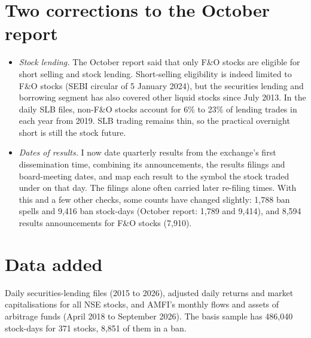\documentclass[11pt,a4paper]{article}
\begin{document}
\section{Two corrections to the October report}
\begin{itemize}
\item \emph{Stock lending.} The October report said that only F\&O stocks are eligible for short selling and stock lending.
Short-selling eligibility is indeed limited to F\&O stocks (SEBI circular of 5 January 2024), but the securities lending
and borrowing segment has also covered other liquid stocks since July 2013. In the daily SLB files, non-F\&O stocks account
for 6\% to 23\% of lending trades in each year from 2019. SLB trading remains thin, so the practical overnight short is
still the stock future.
\item \emph{Dates of results.} I now date quarterly results from the exchange's first dissemination time, combining its
announcements, the results filings and board-meeting dates, and map each result to the symbol the stock traded under on
that day. The filings alone often carried later re-filing times. With this and a few other checks, some counts have
changed slightly: 1,788 ban spells and 9,416 ban stock-days (October report: 1,789 and 9,414), and 8,594 results
announcements for F\&O stocks (7,910).
\end{itemize}

\section{Data added}
Daily securities-lending files (2015 to 2026), adjusted daily returns and market capitalisations for all NSE stocks, and
AMFI's monthly flows and assets of arbitrage funds (April 2018 to September 2026). The basis sample has 486,040 stock-days
for 371 stocks, 8,851 of them in a ban.
\end{document}

